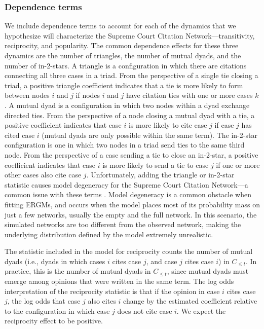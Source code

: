 \documentclass[headsepline=true, abstracton]{scrartcl}
\begin{document}
\subsubsection{Dependence terms}\label{dependence_terms}

We include dependence terms to account for each of the dynamics that we hypothesize will characterize the Supreme Court Citation Network---transitivity, reciprocity, and popularity.  The common dependence effects for these three dynamics are the number of triangles, the number of mutual dyads, and the number of in-2-stars. A triangle is a configuration in which there are citations connecting all three cases in a triad. From the perspective of a single tie closing a triad, a positive triangle coefficient indicates that a tie is more likely to form between nodes $i$ and $j$ if nodes $i$ and $j$ have citation ties with one or more cases $k$. A mutual dyad is a configuration in which two nodes within a dyad exchange directed ties. From the perspective of a node closing a mutual dyad with a tie, a positive coefficient indicates that case $i$ is more likely to cite case $j$ if case $j$ has cited case $i$ (mutual dyads are only possible within the same term). The in-2-star configuration is one in which two nodes in a triad send ties to the same third node. From the perspective of a case sending a tie to close an in-2-star, a positive coefficient indicates that case $i$ is more likely to send a tie to case $j$ if one or more other cases also cite case $j$. Unfortunately, adding the triangle or in-2-star statistic causes model degeneracy for the Supreme Court Citation Network---a common issue with these terms \citep{Handcock.2003}. Model degeneracy is a common obstacle when fitting ERGMs, and occurs when the model places most of its probability mass on just a few networks, usually the empty and the full network. In this scenario, the simulated networks are too different from the observed network, making the underlying distribution defined by the model extremely unrealistic.

The statistic included in the model for reciprocity counts the number of mutual dyads (i.e., dyads in which cases $i$ cites case $j$, and case $j$ cites case $i$) in $C_{\leq t}$. In practice, this is the number of mutual dyads in $C_{\leq t}$, since mutual dyads must emerge among opinions that were written in the same term. The log odds interpretation of the reciprocity statistic is that if the opinion in case $i$ cites case $j$, the log odds that case $j$ also cites $i$ change by the estimated coefficient relative to the configuration in which case $j$ does not cite case $i$. We expect the reciprocity effect to be positive.
\end{document}
